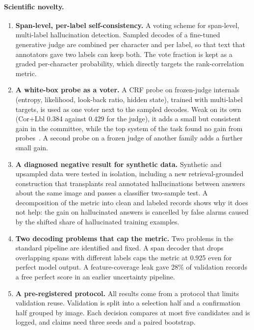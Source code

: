 \paragraph{Scientific novelty.}
\begin{enumerate}
    \item \textbf{Span-level, per-label self-consistency.} A voting scheme for span-level, multi-label hallucination detection. Sampled decodes of a fine-tuned generative judge are combined per character and per label, so that text that annotators gave two labels can keep both. The vote fraction is kept as a graded per-character probability, which directly targets the rank-correlation metric.
    \item \textbf{A white-box probe as a voter.} A CRF probe on frozen-judge internals (entropy, likelihood, look-back ratio, hidden state), trained with multi-label targets, is used as one voter next to the sampled decodes. Weak on its own (Cor+Lbl 0.384 against 0.429 for the judge), it adds a small but consistent gain in the committee, while the top system of the task found no gain from probes~\cite{vroomvroom2026}. A second probe on a frozen judge of another family adds a further small gain.
    \item \textbf{A diagnosed negative result for synthetic data.} Synthetic and upsampled data were tested in isolation, including a new retrieval-grounded construction that transplants real annotated hallucinations between answers about the same image and passes a classifier two-sample test. A decomposition of the metric into clean and labeled records shows why it does not help: the gain on hallucinated answers is cancelled by false alarms caused by the shifted share of hallucinated training examples.
    \item \textbf{Two decoding problems that cap the metric.} Two problems in the standard pipeline are identified and fixed. A span decoder that drops overlapping spans with different labels caps the metric at 0.925 even for perfect model output. A feature-coverage leak gave 28\% of validation records a free perfect score in an earlier uncertainty pipeline.
    \item \textbf{A pre-registered protocol.} All results come from a protocol that limits validation reuse. Validation is split into a selection half and a confirmation half grouped by image. Each decision compares at most five candidates and is logged, and claims need three seeds and a paired bootstrap.
\end{enumerate}

